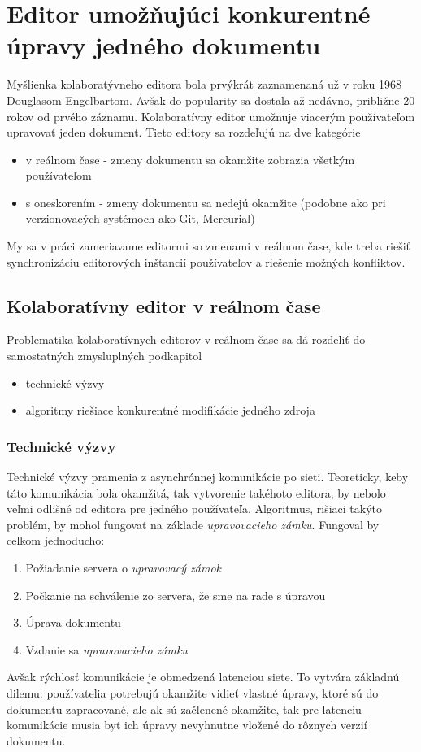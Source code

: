 \chapter{Editor umožňujúci konkurentné úpravy jedného dokumentu}

\label{kap:zdialtelnost} %

Myšlienka kolaboratývneho editora bola prvýkrát zaznamenaná už v roku 1968 Douglasom Engelbartom. 
Avšak do popularity sa dostala až nedávno, približne 20 rokov od prvého záznamu.
Kolaboratívny editor umožnuje viacerým používateľom upravovať jeden dokument.
Tieto editory sa rozdeľujú na dve kategórie
\begin{itemize}
  \item v reálnom čase - zmeny dokumentu sa okamžite zobrazia všetkým používateľom
  \item s oneskorením - zmeny dokumentu sa nedejú okamžite (podobne ako pri verzionovacých
  systémoch ako Git, Mercurial)
\end{itemize}
My sa v práci zameriavame editormi so zmenami v reálnom čase, kde treba
riešiť synchronizáciu editorových inštancií používateľov a riešenie možných konfliktov.

\section{Kolaboratívny editor v reálnom čase}
Problematika kolaboratívnych editorov v reálnom čase sa dá rozdeliť do samostatných zmysluplných 
podkapitol
\begin{itemize}
\item  technické výzvy
\item  algoritmy riešiace konkurentné modifikácie jedného zdroja
\end{itemize}

\subsection{Technické výzvy}
Technické výzvy pramenia z asynchrónnej komunikácie po sieti. Teoreticky, keby táto 
komunikácia bola okamžitá, tak vytvorenie takéhoto editora, by nebolo veľmi odlišné od
editora pre jedného používateľa. Algoritmus, rišiaci takýto problém, by mohol fungovať na 
základe \textit{upravovacieho zámku}. Fungoval by celkom jednoducho:
\begin{enumerate}
  \item Požiadanie servera o \textit{upravovacý zámok}
  \item Počkanie na schválenie zo servera, že sme na rade s úpravou
  \item Úprava dokumentu
  \item Vzdanie sa \textit{upravovacieho zámku}
\end{enumerate}
Avšak rýchlosť komunikácie je obmedzená latenciou siete. To vytvára základnú dilemu: 
používatelia potrebujú okamžite vidieť vlastné úpravy, ktoré sú do dokumentu zapracované,
ale ak sú začlenené okamžite, tak pre latenciu komunikácie musia byť ich
úpravy nevyhnutne vložené do rôznych verzií dokumentu.

